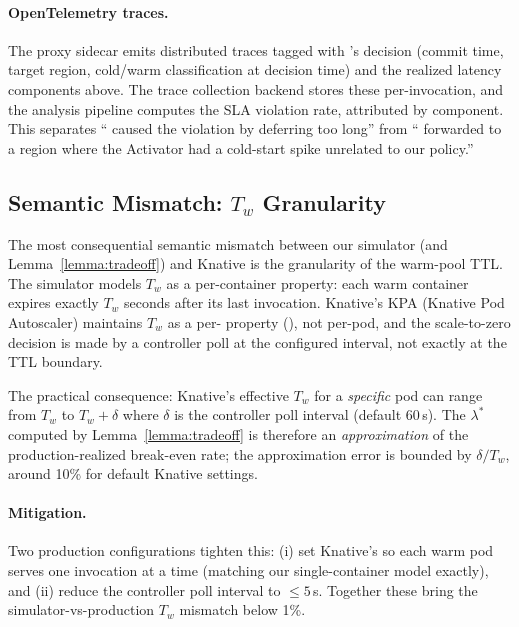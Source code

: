 \paragraph{OpenTelemetry traces.}
The proxy sidecar emits distributed traces tagged with
\GreenFaaS{}'s decision (commit time, target region, cold/warm
classification at decision time) and the realized latency components
above. The trace collection backend stores these per-invocation, and
the analysis pipeline computes the SLA violation rate, attributed by
component. This separates ``\GreenFaaS{} caused the violation by
deferring too long'' from ``\GreenFaaS{} forwarded to a region where
the Activator had a cold-start spike unrelated to our policy.''

\subsection{Semantic Mismatch: $T_w$ Granularity}
\label{sec:deployment:mismatch}

The most consequential semantic mismatch between our simulator
(and Lemma~\ref{lemma:tradeoff}) and Knative is the granularity of
the warm-pool TTL. The simulator models $T_w$ as a per-container
property: each warm container expires exactly $T_w$ seconds after
its last invocation. Knative's KPA (Knative Pod Autoscaler)
maintains $T_w$ as a per- property
(), not per-pod, and the
scale-to-zero decision is made by a controller poll at the configured
interval, not exactly at the TTL boundary.

The practical consequence: Knative's effective $T_w$ for a
\emph{specific} pod can range from $T_w$ to $T_w + \delta$ where
$\delta$ is the controller poll interval (default 60\,s). The
$\lambda^*$ computed by Lemma~\ref{lemma:tradeoff} is therefore an
\emph{approximation} of the production-realized break-even rate; the
approximation error is bounded by $\delta / T_w$, around 10\% for
default Knative settings.

\paragraph{Mitigation.}
Two production configurations tighten this:
(i) set Knative's  so each warm pod
serves one invocation at a time (matching our single-container
model exactly), and (ii) reduce the controller poll interval to
$\le 5$\,s. Together these bring the simulator-vs-production
$T_w$ mismatch below 1\%.

